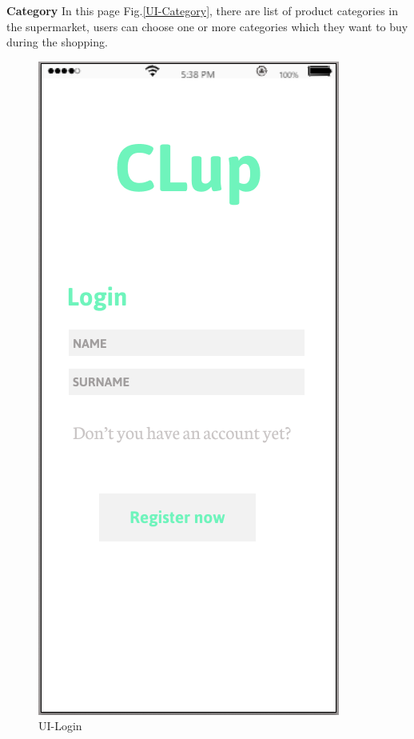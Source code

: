 \documentclass[a4paper,12pt]{report}
\begin{document}
\textbf{Category} In this page Fig.\ref{UI-Category}, there are list of product categories in the supermarket, users can choose one or more categories which they want to buy during the shopping.\\ 

\begin{figure}[H]
	\begin{minipage}[t]{0.5\linewidth}
		\centering
		\includegraphics[scale=0.5]{UI-Login.png}
		\caption{UI-Login}
		\label{UI-Login}
	\end{minipage}%
	\begin{minipage}[t]{0.5\linewidth}
		\centering

\end{minipage}
\end{figure}
\end{document}
